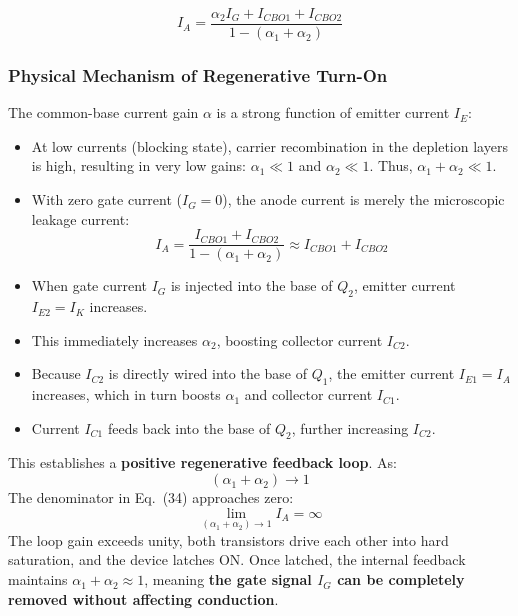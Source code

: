 \documentclass[11pt,a4paper]{article}
\begin{document}
\begin{formulabox}
\begin{equation}
I_A = \frac{\alpha_2 I_G + I_{CBO1} + I_{CBO2}}{1 - (\alpha_1 + \alpha_2)}
\end{equation}
\end{formulabox}

\subsubsection{Physical Mechanism of Regenerative Turn-On}
The common-base current gain $\alpha$ is a strong function of emitter current $I_E$:
\begin{itemize}
  \item At low currents (blocking state), carrier recombination in the depletion layers is high, resulting in very low gains: $\alpha_1 \ll 1$ and $\alpha_2 \ll 1$. Thus, $\alpha_1 + \alpha_2 \ll 1$.
  \item With zero gate current ($I_G = 0$), the anode current is merely the microscopic leakage current:
  \begin{equation}
  I_A = \frac{I_{CBO1} + I_{CBO2}}{1 - (\alpha_1 + \alpha_2)} \approx I_{CBO1} + I_{CBO2}
  \end{equation}
  \item When gate current $I_G$ is injected into the base of $Q_2$, emitter current $I_{E2} = I_K$ increases.
  \item This immediately increases $\alpha_2$, boosting collector current $I_{C2}$.
  \item Because $I_{C2}$ is directly wired into the base of $Q_1$, the emitter current $I_{E1} = I_A$ increases, which in turn boosts $\alpha_1$ and collector current $I_{C1}$.
  \item Current $I_{C1}$ feeds back into the base of $Q_2$, further increasing $I_{C2}$.
\end{itemize}
This establishes a \textbf{positive regenerative feedback loop}. As:
\begin{equation}
(\alpha_1 + \alpha_2) \longrightarrow 1
\end{equation}
The denominator in Eq.~(34) approaches zero:
\begin{equation}
\lim_{(\alpha_1 + \alpha_2) \to 1} I_A = \infty
\end{equation}
The loop gain exceeds unity, both transistors drive each other into hard saturation, and the device latches ON. Once latched, the internal feedback maintains $\alpha_1 + \alpha_2 \approx 1$, meaning \textbf{the gate signal $I_G$ can be completely removed without affecting conduction}.
\end{document}
